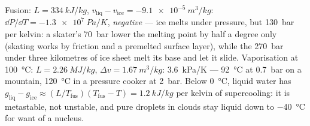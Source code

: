 \begin{example}\label{ex:b2:thermodynamic-potentials:water}
Fusion: $L = \qty{334}{kJ/kg}$, $v_{\text{liq}} - v_{\text{ice}} = -\qty{9.1e-5}{m^3/kg}$:
$\dd P/\dd T = \qty{-1.3e7}{Pa/K}$, \emph{negative} --- ice melts under
pressure, but \qty{130}{bar} per kelvin: a skater's \qty{70}{bar} lower
the melting point by half a degree only (skating works by friction and
a premelted surface layer), while the \qty{270}{bar} under three
kilometres of ice sheet melt its base and let it slide. Vaporisation at
\qty{100}{\celsius}: $L = \qty{2.26}{MJ/kg}$, $\Delta v = \qty{1.67}{m^3/kg}$:
\qty{3.6}{kPa/K} --- \qty{92}{\celsius} at \qty{0.7}{bar} on a mountain,
\qty{120}{\celsius} in a pressure cooker at \qty{2}{bar}. Below
\qty{0}{\celsius}, liquid water has $g_{\text{liq}} - g_{\text{ice}} \approx
(L/T_{\text{fus}})(T_{\text{fus}} - T) = \qty{1.2}{kJ/kg}$ per kelvin of
supercooling: it is metastable, not unstable, and pure droplets in
clouds stay liquid down to \qty{-40}{\celsius} for want of a nucleus.
\end{example}


